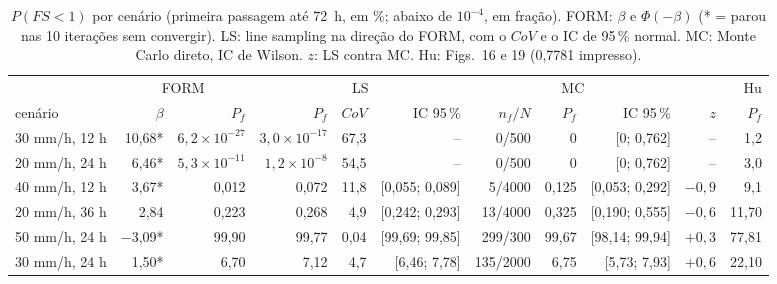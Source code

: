 \begin{table}[htbp]\centering\footnotesize\setlength{\tabcolsep}{3pt}
\caption{$P(FS < 1)$ por cenário (primeira passagem até 72~h, em \%; abaixo de $10^{-4}$, em fração). FORM: $\beta$ e $\Phi(-\beta)$ (* = parou nas 10 iterações sem convergir). LS: line sampling na direção do FORM, com o $CoV$ e o IC de 95\,\% normal. MC: Monte Carlo direto, IC de Wilson. $z$: LS contra MC. Hu: Figs.~16 e 19 (0,7781 impresso).}\label{tab:pf}
\begin{tabular}{lrrrrrrrrrr}\toprule
 & \multicolumn{2}{c}{FORM} & \multicolumn{3}{c}{LS} & \multicolumn{3}{c}{MC} & & Hu \\\cmidrule(lr){2-3}\cmidrule(lr){4-6}\cmidrule(lr){7-9}
cenário & $\beta$ & $P_f$ & $P_f$ & $CoV$ & IC 95\,\% & $n_f/N$ & $P_f$ & IC 95\,\% & $z$ & $P_f$ \\\midrule
30 mm/h, 12 h & 10{,}68* & $6{,}2\times 10^{-27}$ & $3{,}0\times 10^{-17}$ & 67{,}3 & -- & 0/500 & 0 & [0; 0{,}762] & -- & 1{,}2 \\
20 mm/h, 24 h & 6{,}46* & $5{,}3\times 10^{-11}$ & $1{,}2\times 10^{-8}$ & 54{,}5 & -- & 0/500 & 0 & [0; 0{,}762] & -- & 3{,}0 \\
40 mm/h, 12 h & 3{,}67* & 0{,}012 & 0{,}072 & 11{,}8 & [0{,}055; 0{,}089] & 5/4000 & 0{,}125 & [0{,}053; 0{,}292] & $-0{,}9$ & 9{,}1 \\
20 mm/h, 36 h & 2{,}84 & 0{,}223 & 0{,}268 & 4{,}9 & [0{,}242; 0{,}293] & 13/4000 & 0{,}325 & [0{,}190; 0{,}555] & $-0{,}6$ & 11{,}70 \\
50 mm/h, 24 h & $-$3{,}09* & 99{,}90 & 99{,}77 & 0{,}04 & [99{,}69; 99{,}85] & 299/300 & 99{,}67 & [98{,}14; 99{,}94] & $+0{,}3$ & 77{,}81 \\
30 mm/h, 24 h & 1{,}50* & 6{,}70 & 7{,}12 & 4{,}7 & [6{,}46; 7{,}78] & 135/2000 & 6{,}75 & [5{,}73; 7{,}93] & $+0{,}6$ & 22{,}10 \\
\bottomrule\end{tabular}\end{table}
